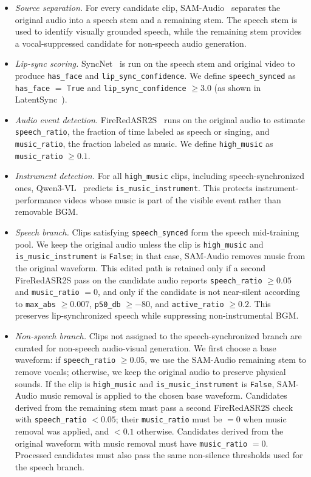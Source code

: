 \documentclass{llmxive}
\begin{document}
\begin{itemize}
    \item \textit{Source separation.} For every candidate clip, SAM-Audio~\citep{shi2025samaudio} separates the original audio into a speech stem and a remaining stem. The speech stem is used to identify visually grounded speech, while the remaining stem provides a vocal-suppressed candidate for non-speech audio generation.
    \item \textit{Lip-sync scoring.} SyncNet~\citep{chung2016out} is run on the speech stem and original video to produce \texttt{has\_face} and \texttt{lip\_sync\_confidence}. We define \texttt{speech\_synced} as \texttt{has\_face} $=$ \texttt{True} and \texttt{lip\_sync\_confidence} $\geq 3.0$ (as shown in LatentSync~\citep{li2024latentsync}).
    \item \textit{Audio event detection.} FireRedASR2S~\citep{xu2026fireredasr2s} runs on the original audio to estimate \texttt{speech\_ratio}, the fraction of time labeled as speech or singing, and \texttt{music\_ratio}, the fraction labeled as music. We define \texttt{high\_music} as \texttt{music\_ratio} $\geq 0.1$.
    \item \textit{Instrument detection.} For all \texttt{high\_music} clips, including speech-synchronized ones, Qwen3-VL~\citep{qwen3vl2025} predicts \texttt{is\_music\_instrument}. This protects instrument-performance videos whose music is part of the visible event rather than removable BGM.
    \item \textit{Speech branch.} Clips satisfying \texttt{speech\_synced} form the speech mid-training pool. We keep the original audio unless the clip is \texttt{high\_music} and \texttt{is\_music\_instrument} is \texttt{False}; in that case, SAM-Audio removes music from the original waveform. This edited path is retained only if a second FireRedASR2S pass on the candidate audio reports \texttt{speech\_ratio} $\geq 0.05$ and \texttt{music\_ratio} $= 0$, and only if the candidate is not near-silent according to \texttt{max\_abs} $\geq 0.007$, \texttt{p50\_db} $\geq -80$, and \texttt{active\_ratio} $\geq 0.2$. This preserves lip-synchronized speech while suppressing non-instrumental BGM.
    \item \textit{Non-speech branch.} Clips not assigned to the speech-synchronized branch are curated for non-speech audio-visual generation. We first choose a base waveform: if \texttt{speech\_ratio} $\geq 0.05$, we use the SAM-Audio remaining stem to remove vocals; otherwise, we keep the original audio to preserve physical sounds. If the clip is \texttt{high\_music} and \texttt{is\_music\_instrument} is \texttt{False}, SAM-Audio music removal is applied to the chosen base waveform. Candidates derived from the remaining stem must pass a second FireRedASR2S check with \texttt{speech\_ratio} $< 0.05$; their \texttt{music\_ratio} must be $= 0$ when music removal was applied, and $< 0.1$ otherwise. Candidates derived from the original waveform with music removal must have \texttt{music\_ratio} $= 0$. Processed candidates must also pass the same non-silence thresholds used for the speech branch.

\end{itemize}
\end{document}
